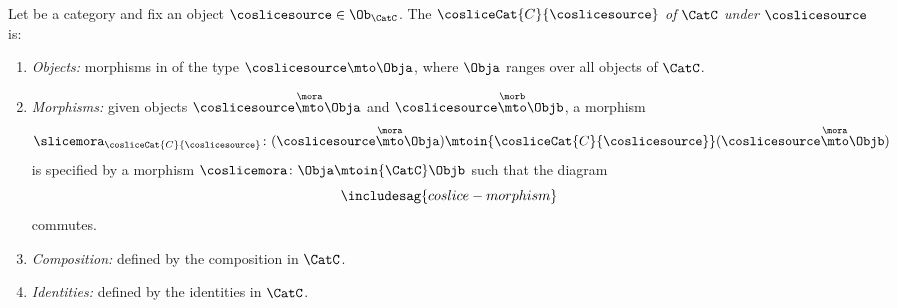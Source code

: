 \begin{ctdefinition}
    \label{def:coslice-category}

    Let \CatC be a category and fix an object $\coslicesource \in \Ob_\CatC$.
    The  $\cosliceCat{C}{\coslicesource}$ \emph{of} $\CatC$ \emph{under} $\coslicesource$ is:
    \begin{enumerate}
        \item \emph{Objects:} morphisms in \CatC of the type $\coslicesource \mto \Obja$, where $\Obja$ ranges over all objects of $\CatC$.
        \item \emph{Morphisms:} given objects $\coslicesource \overset{\mora}{\mto} \Obja$ and $\coslicesource  \overset{\morb}{\mto} \Objb$, a morphism
              \begin{equation}
                  \slicemora_{\cosliceCat{C}{\coslicesource}} \colon (\coslicesource \overset{\mora}{\mto} \Obja)
                  \mtoin{\cosliceCat{C}{\coslicesource}}
                  (\coslicesource \overset{\mora}{\mto} \Objb)
              \end{equation}
              is specified by a morphism $\coslicemora \colon \Obja \mtoin{\CatC} \Objb$ such that the diagram
              \begin{equation}\label{eq:coslice-morphism}
                  \includesag{coslice-morphism}
              \end{equation}
              commutes.

        \item \emph{Composition:} defined by the composition in $\CatC$.
        \item \emph{Identities:} defined by the identities in $\CatC$.
    \end{enumerate}
\end{ctdefinition}


